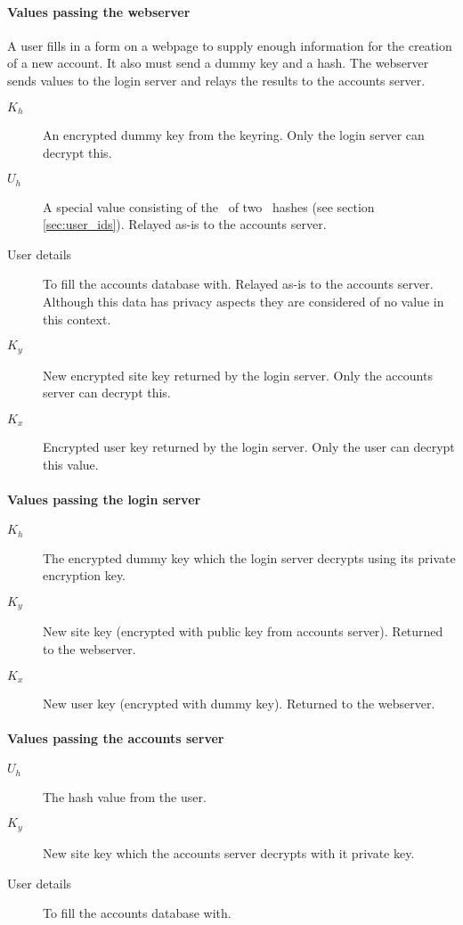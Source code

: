 \paragraph{Values passing the webserver}
A user fills in a form on a webpage to supply enough information for the creation of a new account.
It also must send a dummy key and a hash.
The webserver sends values to the login server and relays the results to the accounts server.
\begin{description}
\item[$K_h$]	An encrypted dummy key from the keyring.
	Only the login server can decrypt this.
\item[$U_h$]	A special value consisting of the \XOR\ of two \SHA\ hashes (see section \ref{sec:user_ids}).
	Relayed as-is to the accounts server.
\item[User details]	To fill the accounts database with.
	Relayed as-is to the accounts server.
	Although this data has privacy aspects they are considered of no value in this context.
\item[$K_y$]	New encrypted site key returned by the login server.
	Only the accounts server can decrypt this.
\item[$K_x$]	Encrypted user key returned by the login server.
	Only the user can decrypt this value.
\end{description}
\paragraph{Values passing the login server}
\begin{description}
\item[$K_h$]	The encrypted dummy key which the login server decrypts using its private encryption key.
\item[$K_y$]	New site key (encrypted with public key from accounts server).
	Returned to the webserver.
\item[$K_x$]	New user key (encrypted with dummy key).
	Returned to the webserver.
\end{description}
\paragraph{Values passing the accounts server}
\begin{description}
\item[$U_h$]	The hash value from the user.
\item[$K_y$]	New site key which the accounts server decrypts with it private key.
\item[User details]	To fill the accounts database with.
\end{description}
